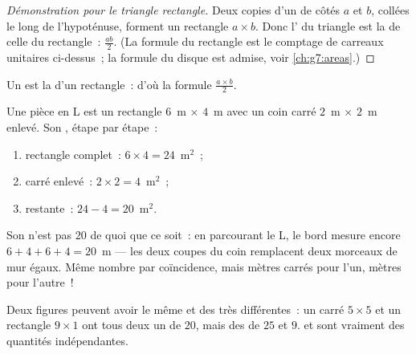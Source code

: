 \begin{proof}[Démonstration pour le triangle rectangle]
Deux copies d'un  de côtés $a$ et $b$, collées le
long de l'hypoténuse, forment un rectangle $a \times b$. Donc l'
du triangle est la  de celle du rectangle~: $\frac{ab}{2}$. (La
formule du rectangle est le comptage de carreaux unitaires ci-dessus~;
la formule du disque est admise, voir \cref{ch:g7:areas}.)
\end{proof}

\begin{omfigure}

{\small Un  est la  d'un rectangle~: d'où la
formule $\frac{a\times b}{2}$.}
\end{omfigure}

\begin{example}\label{ex:g6:measure:composite}
Une pièce en L est un rectangle $6$~m $\times$ $4$~m avec un coin
carré $2$~m $\times$ $2$~m enlevé. Son , étape par étape~:
\begin{enumerate}
  \item rectangle complet~: $6 \times 4 = 24$~m$^2$~;
  \item carré enlevé~: $2 \times 2 = 4$~m$^2$~;
  \item {} restante~: $24 - 4 = 20$~m$^2$.
\end{enumerate}
Son \emph{} n'est pas $20$ de quoi que ce soit~: en
parcourant le L, le bord mesure encore $6 + 4 + 6 + 4 = 20$~m ---
les deux coupes du coin remplacent deux morceaux de mur égaux. Même
nombre par coïncidence, mais mètres carrés pour l'un, mètres pour
l'autre~!
\end{example}

\begin{remark}
Deux figures peuvent avoir le même  et des  très
différentes~: un carré $5 \times 5$ et un rectangle $9 \times 1$ ont
tous deux un  de $20$, mais des  de $25$ et $9$.
 et  sont vraiment des quantités indépendantes.
\end{remark}

